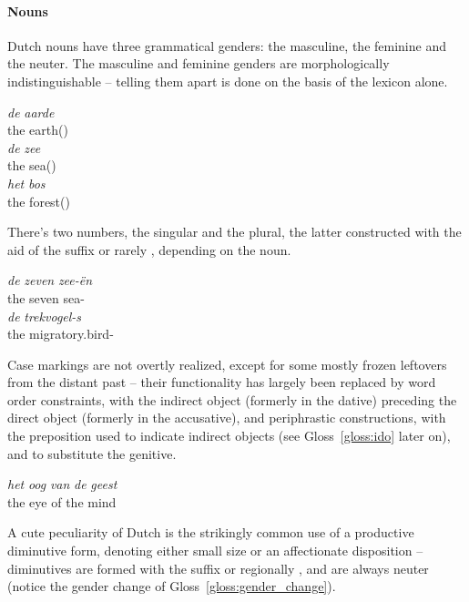 \paragraph{Nouns}
Dutch nouns have three grammatical genders: the masculine, the feminine and the neuter.
The masculine and feminine genders are morphologically indistinguishable -- telling them apart is done on the basis of the lexicon alone.
\begin{exe}
\ex\label{gloss:genders}
\begin{xlist}
\ex
\gll \textit{de} \textit{aarde}\\
the earth()\\
\ex
\gll \textit{de} \textit{zee}\\
the sea()\\
\ex
\gll \textit{het} \textit{bos}\\
the forest()\\
\end{xlist}
\end{exe}
There's two numbers, the singular and the plural, the latter constructed with the aid of the suffix  or rarely , depending on the noun.
\begin{exe}
\ex 
\begin{xlist}
\ex
\gll \textit{de} \textit{zeven} \textit{zee-\"{e}n}\\
the seven sea-\\
\ex
\gll \textit{de} \textit{trekvogel-s}\\
the  migratory.bird-\\
\end{xlist}
\end{exe}
Case markings are not overtly realized, except for some mostly frozen leftovers from the distant past -- their functionality has largely been replaced by word order constraints, with the indirect object (formerly in the dative) preceding the direct object (formerly in the accusative), and periphrastic constructions, with the preposition  used to indicate indirect objects (see Gloss~\ref{gloss:ido} later on), and  to substitute the genitive.
\begin{exe}
\ex
\gll \textit{het} \textit{oog} \textit{van} \textit{de} \textit{geest}\\
the eye of the mind\\
\end{exe}
A cute peculiarity of Dutch is the strikingly common use of a productive diminutive form, denoting either small size or an affectionate disposition -- diminutives are formed with the suffix  or regionally , and are always neuter (notice the gender change of Gloss~\ref{gloss:gender_change}).

